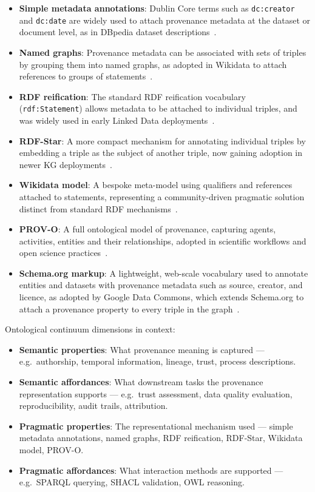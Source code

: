\documentclass[runningheads]{llncs}
\begin{document}
\begin{itemize}
    \item \textbf{Simple metadata annotations}: Dublin Core terms such as \texttt{dc:creator} and \texttt{dc:date} are widely used to attach provenance metadata at the dataset or document level, as in DBpedia dataset descriptions~\cite{dcterms}.
    \item \textbf{Named graphs}: Provenance metadata can be associated with sets of triples by grouping them into named graphs, as adopted in Wikidata to attach references to groups of statements~\cite{wikidata}.
    \item \textbf{RDF reification}: The standard RDF reification vocabulary (\texttt{rdf:Statement}) allows metadata to be attached to individual triples, and was widely used in early Linked Data deployments~\cite{rdf11}.
    \item \textbf{RDF-Star}: A more compact mechanism for annotating individual triples by embedding a triple as the subject of another triple, now gaining adoption in newer KG deployments~\cite{rdfstar}.
    \item \textbf{Wikidata model}: A bespoke meta-model using qualifiers and references attached to statements, representing a community-driven pragmatic solution distinct from standard RDF mechanisms~\cite{wikidata}.
    \item \textbf{PROV-O}: A full ontological model of provenance, capturing agents, activities, entities and their relationships, adopted in scientific workflows and open science practices~\cite{provo}.
    \item \textbf{Schema.org markup}: A lightweight, web-scale vocabulary used to annotate entities and datasets with provenance metadata such as source, creator, and licence, as adopted by Google Data Commons, which extends Schema.org to attach a provenance property to every triple in the graph~\cite{datacommons,schemaorg}.
\end{itemize}

Ontological continuum dimensions in context:

\begin{itemize}
    \item \textbf{Semantic properties}: What provenance meaning is captured --- e.g.\ authorship, temporal information, lineage, trust, process descriptions.
    \item \textbf{Semantic affordances}: What downstream tasks the provenance representation supports --- e.g.\ trust assessment, data quality evaluation, reproducibility, audit trails, attribution.
    \item \textbf{Pragmatic properties}: The representational mechanism used --- simple metadata annotations, named graphs, RDF reification, RDF-Star, Wikidata model, PROV-O.
    \item \textbf{Pragmatic affordances}: What interaction methods are supported --- e.g.\ SPARQL querying, SHACL validation, OWL reasoning.
\end{itemize}
\end{document}
